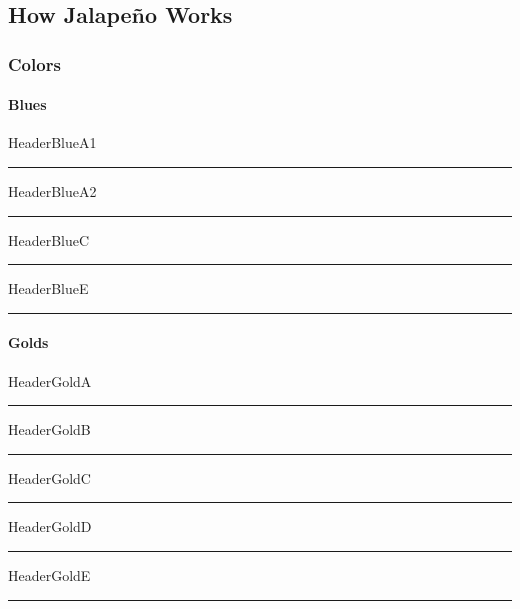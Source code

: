 \documentclass[class=book , crop=false]{standalone}
\title{}  %
\begin{document}

\ifstandalone
\frontmatter %
\maketitle %
\tableofcontents %
\clearpage
\mainmatter %
\fi

\subsection[How Jalape\~no Works]{\large How \LARGE Jalape\~no \large Works}
\subsubsection{Colors}
%
\paragraph[Blues]{Blues\texorpdfstring{\\}{}}
\textcolor{HeaderBlueA1}{HeaderBlueA1}
\noindent\textcolor{HeaderBlueA1}{\rule{\linewidth}{.5mm}}
\textcolor{HeaderBlueA2}{HeaderBlueA2}
\noindent\textcolor{HeaderBlueA2}{\rule{\linewidth}{.5mm}}
\textcolor{HeaderBlueC}{HeaderBlueC}
\noindent\textcolor{HeaderBlueC}{\rule{\linewidth}{.5mm}}
\textcolor{HeaderBlueE}{HeaderBlueE}
\noindent\textcolor{HeaderBlueE}{\rule{\linewidth}{.5mm}}
%
\paragraph[Golds]{Golds\texorpdfstring{\\}{}}
\textcolor{HeaderGoldA}{HeaderGoldA}
\noindent\textcolor{HeaderGoldA}{\rule{\linewidth}{.5mm}}
\textcolor{HeaderGoldB}{HeaderGoldB}
\noindent\textcolor{HeaderGoldB}{\rule{\linewidth}{.5mm}}
\textcolor{HeaderGoldC}{HeaderGoldC}
\noindent\textcolor{HeaderGoldC}{\rule{\linewidth}{.5mm}}
\textcolor{HeaderGoldD}{HeaderGoldD}
\noindent\textcolor{HeaderGoldD}{\rule{\linewidth}{.5mm}}
\textcolor{HeaderGoldE}{HeaderGoldE}
\noindent\textcolor{HeaderGoldE}{\rule{\linewidth}{.5mm}}
%
\end{document}
